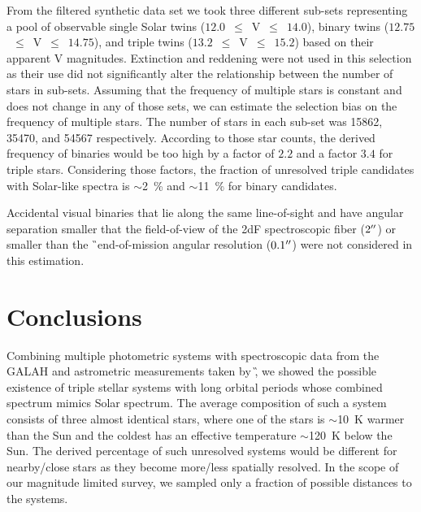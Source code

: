 From the filtered synthetic data set we took three different sub-sets representing a pool of observable single Solar twins ($12.0$~$\leq$~V~$\leq$~$14.0$), binary twins ($12.75$~$\leq$~V~$\leq$~$14.75$), and triple twins ($13.2$~$\leq$~V~$\leq$~$15.2$) based on their apparent V magnitudes. Extinction and reddening were not used in this selection as their use did not significantly alter the relationship between the number of stars in sub-sets. Assuming that the frequency of multiple stars is constant and does not change in any of those sets, we can estimate the selection bias on the frequency of multiple stars. The number of stars in each sub-set was 15862, 35470, and 54567 respectively. According to those star counts, the derived frequency of binaries would be too high by a factor of $2.2$ and a factor $3.4$ for triple stars. Considering those factors, the fraction of unresolved triple candidates with Solar-like spectra is $\sim$2~\% and $\sim$11~\% for binary candidates. 

Accidental visual binaries that lie along the same line-of-sight and have angular separation smaller that the field-of-view of the 2dF spectroscopic fiber ($2 \hbox{$^{\prime\prime}$}$) or smaller than the \G\ end-of-mission angular resolution ($0.1 \hbox{$^{\prime\prime}$}$) were not considered in this estimation.

\section{Conclusions}
\label{sec:concl}
Combining multiple photometric systems with spectroscopic data from the GALAH and astrometric measurements taken by \G, we showed the possible existence of triple stellar systems with long orbital periods whose combined spectrum mimics Solar spectrum. The average composition of such a system consists of three almost identical stars, where one of the stars is $\sim$10~K warmer than the Sun and the coldest has an effective temperature $\sim$120~K below the Sun. The derived percentage of such unresolved systems would be different for nearby/close stars as they become more/less spatially resolved. In the scope of our magnitude limited survey, we sampled only a fraction of possible distances to the systems.

